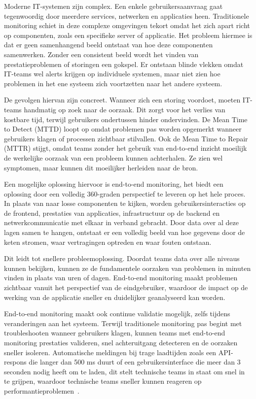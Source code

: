 Moderne IT-systemen zijn complex. Een enkele gebruikersaanvraag gaat tegenwoordig door meerdere services, netwerken en applicaties heen. Traditionele monitoring schiet in deze complexe omgevingen tekort omdat het zich apart richt op componenten, zoals een specifieke server of applicatie. Het probleem hiermee is dat er geen samenhangend beeld ontstaat van hoe deze componenten samenwerken. Zonder een consistent beeld wordt het vinden van prestatieproblemen of storingen een gokspel. Er ontstaan blinde vlekken omdat IT-teams wel alerts krijgen op individuele systemen, maar niet zien hoe problemen in het ene systeem zich voortzetten naar het andere systeem.

De gevolgen hiervan zijn concreet. Wanneer zich een storing voordoet, moeten IT-teams handmatig op zoek naar de oorzaak. Dit zorgt voor het verlies van kostbare tijd, terwijl gebruikers ondertussen hinder ondervinden. De Mean Time to Detect (MTTD) loopt op omdat problemen pas worden opgemerkt wanneer gebruikers klagen of processen zichtbaar stilvallen. Ook de Mean Time to Repair (MTTR) stijgt, omdat teams zonder het gebruik van end-to-end inzicht moeilijk de werkelijke oorzaak van een probleem kunnen achterhalen. Ze zien wel symptomen, maar kunnen dit moeilijker herleiden naar de bron.

Een mogelijke oplossing hiervoor is end-to-end monitoring, het biedt een oplossing door een volledig 360-graden perspectief te leveren op het hele proces. In plaats van naar losse componenten te kijken, worden gebruikersinteracties op de frontend, prestaties van applicaties, infrastructuur op de backend en netwerkcommunicatie met elkaar in verband gebracht. Door data over al deze lagen samen te hangen, ontstaat er een volledig beeld van hoe gegevens door de keten stromen, waar vertragingen optreden en waar fouten ontstaan.

Dit leidt tot snellere probleemoplossing. Doordat teams data over alle niveaus kunnen bekijken, kunnen ze de fundamentele oorzaken van problemen in minuten vinden in plaats van uren of dagen. End-to-end monitoring maakt problemen zichtbaar vanuit het perspectief van de eindgebruiker, waardoor de impact op de werking van de applicatie sneller en duidelijker geanalyseerd kan worden.

End-to-end monitoring maakt ook continue validatie mogelijk, zelfs tijdens veranderingen aan het systeem. Terwijl traditionele monitoring pas begint met troubleshooten wanneer gebruikers klagen, kunnen teams met end-to-end monitoring prestaties valideren, snel achteruitgang detecteren en de oorzaken sneller isoleren. Automatische meldingen bij trage laadtijden zoals een API-respons die langer dan 500 ms duurt of een gebruikersinterface die meer dan 3 seconden nodig heeft om te laden, dit stelt technische teams in staat om snel in te grijpen, waardoor technische teams sneller kunnen reageren op performantieproblemen~\autocite{Walton2020}.

